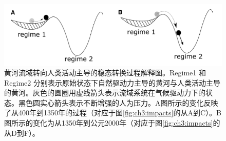 \begin{figure}[htb] %
    \includegraphics[width=\textwidth]{img/ch3/ch3_regime_shift.png}
    \caption[黄河流域转向人类活动主导的稳态转换过程解释图]{黄河流域转向人类活动主导的稳态转换过程解释图。Regime1 和 Regime2 分别表示原始状态下自然驱动力主导的黄河与人类活动主导的黄河。灰色的圆圈用虚线箭头表示流域系统在气候驱动力下的状态。黑色圆实心箭头表示不断增强的人为压力。A图所示的变化反映了从400年到1350年的过程（对应于图\ref{fig:ch3:impacts}的从A到C）。B图所示的变化为从1350年到公元2000年（对应于图\ref{fig:ch3:impacts}的从D到F）。}
    \label{fig:ch3:regime_shift}
\end{figure}
